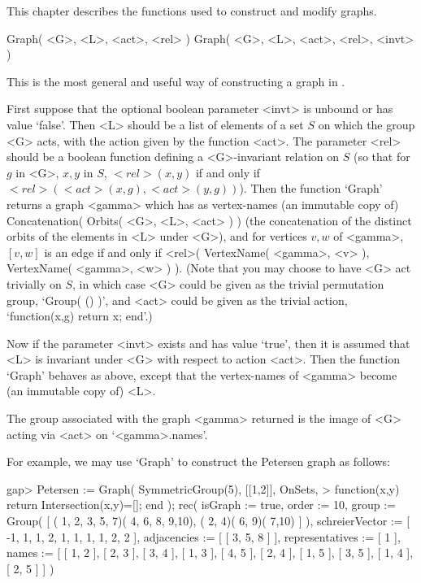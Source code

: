 %
%
%
%

This chapter describes the functions used to construct and modify graphs.


\>Graph( <G>, <L>, <act>, <rel> )
\>Graph( <G>, <L>, <act>, <rel>, <invt> )

This  is the most  general  and  useful  way  of constructing a graph
in {\GRAPE}.

First suppose that the optional boolean parameter <invt> is unbound or
has value `false'. Then <L> should be a list of elements of a set $S$ on
which the group <G> acts, with the action given by the function <act>. The
parameter <rel> should be a boolean function defining a <G>-invariant
relation on $S$ (so that for $g$ in <G>, $x,y$ in $S$, $<rel>(x,y)$
if and only if $<rel>(<act>(x,g),<act>(y,g))$). Then the function `Graph'
returns a graph <gamma> which has as vertex-names (an immutable copy of)
\begintt
  Concatenation( Orbits( <G>, <L>, <act> ) ) 
\endtt
(the concatenation of the distinct orbits of the elements in <L> under
<G>), and for vertices $v,w$ of <gamma>, $[v,w]$ is an edge if and only if
\begintt
  <rel>( VertexName( <gamma>, <v> ), VertexName( <gamma>, <w> ) ).
\endtt
(Note that you may choose to have <G> act trivially on $S$, in
which case <G> could be given as the trivial permutation group, 
`Group( () )', and <act> could be given as the trivial action, 
`function(x,g) return x; end'.)

Now if the  parameter <invt> exists  and  has value `true',  then  it  is
assumed  that <L> is invariant  under <G> with respect  to  action <act>.
Then the function `Graph' behaves as above,  except that the vertex-names
of <gamma> become (an immutable copy of) <L>.

The group associated with the graph <gamma> returned is  the image of <G>
acting via <act> on `<gamma>.names'.

For example, we may use `Graph' to construct the Petersen graph as follows:

\beginexample
gap> Petersen := Graph( SymmetricGroup(5), [[1,2]], OnSets,
>                    function(x,y) return Intersection(x,y)=[]; end );
rec(
  isGraph := true,
  order := 10,
  group := Group( [ ( 1, 2, 3, 5, 7)( 4, 6, 8, 9,10), ( 2, 4)( 6, 9)( 7,10)
     ] ),
  schreierVector := [ -1, 1, 1, 2, 1, 1, 1, 1, 2, 2 ],
  adjacencies := [ [ 3, 5, 8 ] ],
  representatives := [ 1 ],
  names := [ [ 1, 2 ], [ 2, 3 ], [ 3, 4 ], [ 1, 3 ], [ 4, 5 ], [ 2, 4 ],
      [ 1, 5 ], [ 3, 5 ], [ 1, 4 ], [ 2, 5 ] ] )
\endexample

